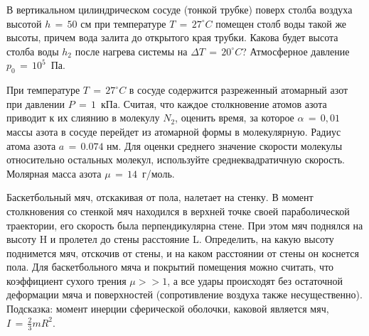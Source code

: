 \AddProb В вертикальном цилиндрическом сосуде (тонкой трубке) поверх столба воздуха высотой $h\,=\,50$ см при температуре $T\,=\,27^{\circ}C$ 
помещен столб воды такой же высоты, причем вода залита до открытого края трубки. Какова будет высота столба воды $h_2$ после нагрева системы на 
$\Delta T\,=\,20^{\circ}C$? Атмосферное давление $p_0\,=\,10^5$~Па.

\AddProb При температуре $T\,=\,27^{\circ}C$ в сосуде содержится разреженный атомарный азот при давлении $P\,=\,1$~кПа. 
Считая, что каждое столкновение атомов азота приводит к их слиянию в молекулу $N_2$, оценить время, за которое $\alpha\,=\,0,01$ массы азота в сосуде 
перейдет из атомарной формы в молекулярную. Радиус атома азота $a\,=\,0.074$ нм. Для оценки среднего значение скорости молекулы 
относительно остальных молекул, используйте среднеквадратичную скорость. Молярная масса азота $\mu\,=\,14$~г/моль.

\AddProb Баскетбольный мяч, отскакивая от пола, налетает на стенку. В момент столкновения со стенкой мяч находился в верхней точке 
своей параболической траектории, его скорость была перпендикулярна стене. При этом мяч поднялся на высоту H и пролетел до стены 
расстояние L. Определить, на какую высоту поднимется мяч, отскочив от стены, и на каком расстоянии от стены он коснется пола. 
Для баскетбольного мяча и покрытий помещения можно считать, что коэффициент сухого трения $\mu>>1$, а все удары происходят 
без остаточной деформации мяча и поверхностей (сопротивление воздуха также несущественно). Подсказка: момент инерции сферической оболочки, 
каковой является мяч, $I\,=\,\frac{2}{3}mR^2$.